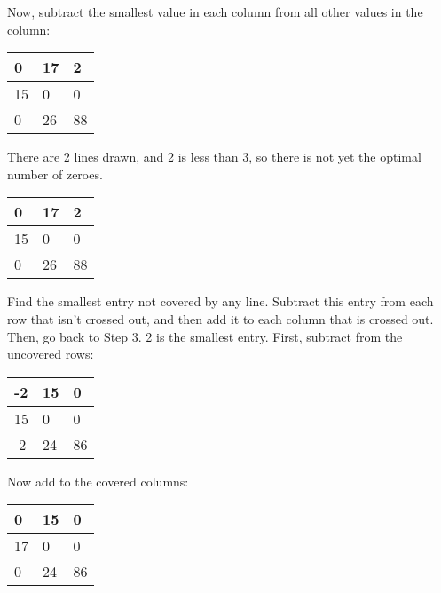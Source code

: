 Now, subtract the smallest value in each column from all other values in the column:

\begin{table}[H]
\centering
\begin{tabular}{|m{0.5cm}|m{0.5cm}|m{0.5cm}|}
  \hline
  0 & 17 & 2 \\
  \hline
  15 & 0 & 0 \\
  \hline
  0 & 26 & 88 \\
  \hline
\end{tabular}
\end{table}

There are 2 lines drawn, and 2 is less than 3, so there is not yet the optimal number of zeroes.

\begin{table}[H]
\centering
\begin{tabular}{|m{0.5cm}|m{0.5cm}|m{0.5cm}|}
  \hline
  \cellcolor{gray!25} 0 & 17 & 2 \\
  \hline
  \cellcolor{gray!25} 15 & \cellcolor{gray!25} 0 & \cellcolor{gray!25} 0 \\
  \hline
  \cellcolor{gray!25} 0 & 26 & 88 \\
  \hline
\end{tabular}
\end{table}

Find the smallest entry not covered by any line. Subtract this entry from each row that isn’t crossed out, and then add it to each column that is crossed out. Then, go back to Step 3.
2 is the smallest entry.
First, subtract from the uncovered rows:

\begin{table}[H]
\centering
\begin{tabular}{|m{0.5cm}|m{0.5cm}|m{0.5cm}|}
  \hline
  \cellcolor{gray!25} -2 & 15 & 0 \\
  \hline
  \cellcolor{gray!25} 15 & \cellcolor{gray!25} 0 & \cellcolor{gray!25} 0 \\
  \hline
  \cellcolor{gray!25} -2 & 24 & 86 \\
  \hline
\end{tabular}
\end{table}

Now add to the covered columns:

\begin{table}[H]
\centering
\begin{tabular}{|m{0.5cm}|m{0.5cm}|m{0.5cm}|}
  \hline
  \cellcolor{gray!25} 0 & 15 & 0 \\
  \hline
  \cellcolor{gray!25} 17 & \cellcolor{gray!25} 0 & \cellcolor{gray!25} 0 \\
  \hline
  \cellcolor{gray!25} 0 & 24 & 86 \\
  \hline
\end{tabular}
\end{table}

